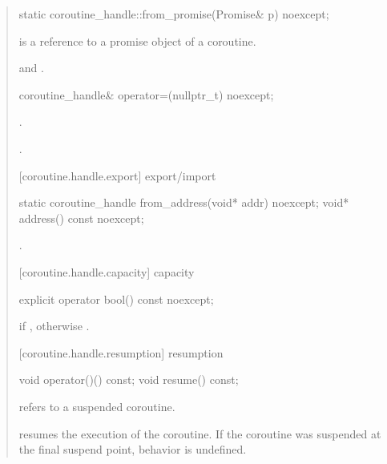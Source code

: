 \begin{quote}
\begin{itemdecl}
  static coroutine_handle::from_promise(Promise& p) noexcept;	
\end{itemdecl}
\begin{itemdescr}
  \pnum
  \precondition {} is a reference to a promise object of a coroutine.
  
	\pnum
  \postconditions {} and .
\end{itemdescr}

\begin{itemdecl}
  coroutine_handle& operator=(nullptr_t) noexcept;
\end{itemdecl}
\begin{itemdescr}
	\pnum\postconditions {}.
  
  \pnum\returns {}.
\end{itemdescr}

[coroutine.handle.export]{ export/import}
\begin{itemdecl}
  static coroutine_handle from_address(void* addr) noexcept;		
  void* address() const noexcept;
\end{itemdecl}

\begin{itemdescr}
  \pnum
  \postconditions {}.
\end{itemdescr}

[coroutine.handle.capacity]{ capacity}
\begin{itemdecl}
  explicit operator bool() const noexcept;
\end{itemdecl}

\begin{itemdescr}
  \pnum
  \returns {} if , otherwise .
\end{itemdescr}

[coroutine.handle.resumption]{ resumption}
\begin{itemdecl}
  void operator()() const;
  void resume() const;	
\end{itemdecl}
\begin{itemdescr}
  \pnum
  \precondition {} refers to a suspended coroutine.
  
  \pnum
  \effects resumes the execution of the coroutine. If the coroutine was suspended
  at the final suspend point, behavior is undefined.
\end{itemdescr}


\end{quote}
